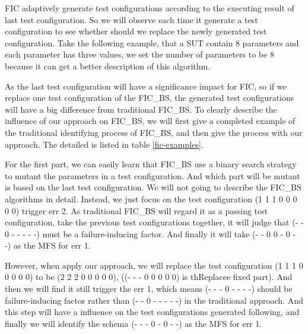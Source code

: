 \documentclass{sig-alternate}
\begin{document}
FIC adaptively generate test configurations according to the executing result of last test configuration. So we will observe each time it generate a test configuration to see whether should we replace the newly generated test configuration. Take the following example, that a SUT contain 8 parameters and each parameter has three values, we set the number of parameters to be 8 because it can get a better description of this algorithm.

As the last test configuration will have a significance impact for FIC, so if we replace one test configuration of the FIC\_BS, the generated test configurations will have a big difference from traditional FIC\_BS. To clearly describe the influence of our approach on FIC\_BS, we will first give a completed example of the traditional identifying process of FIC\_BS, and then give the process with our approach. The detailed is listed in table \ref{fic-examples}.

For the first part, we can easily learn that FIC\_BS use a binary search strategy to mutant the parameters in a test configuration. And which part will be mutant is based on the last test configuration. We will not going to describe the FIC\_BS algorithms in detail. Instead, we just focus on the test configuration (1 1 1 0 0 0 0 0) trigger err 2. As traditional FIC\_BS will regard it as a passing test configuration, take the previous test configurations together, it will judge that (- - 0 - - - - -) must be a failure-inducing factor. And finally it will take (- - 0 0 - 0 - -) as the MFS for err 1.

However, when apply our approach, we will replace the test configuration (1 1 1 0 0 0 0 0) to be (2 2 2 0 0 0 0 0), ((- - - 0 0 0 0 0) is thReplacee fixed part). And then we will find it still trigger the err 1, which means (- - - 0 - - - -) should be failure-inducing factor rather than (- - 0 - - - - -) in the traditional approach. And this step will have a influence on the test configurations generated following, and finally we will identify the schema (- - - 0 - 0 - -) as the MFS for err 1.
\end{document}
